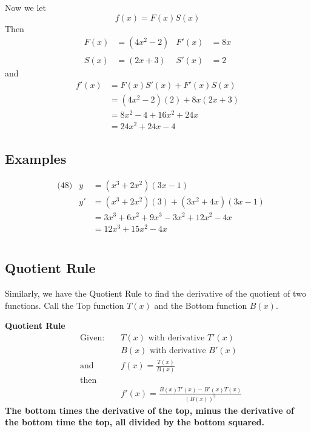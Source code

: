 \documentclass[14pt]{extarticle}
\begin{document}
Now we let
$$f(x) = F(x)S(x)$$
Then
\begin{align*}
	F(x) &= (4x^2 -2) & F'(x)&=8x \\\\
	S(x) &= (2x+3) & S'(x)&= 2
\end{align*}
and
\begin{align*}
	f'(x) &= F(x)S'(x) + F'(x)S(x) \\
	&= (4x^2 -2)(2) + 8x(2x+3) \\
	&= 8x^2-4 + 16x^2 +24x \\
	&= 24x^2 + 24x-4
\end{align*}

\subsection*{Examples}
\begin{align*}
	&\text{(48)} &y &= (x^3 + 2x^2)(3x-1) \\
	&			&y' &= (x^3 + 2x^2)(3) + (3x^2 + 4x)(3x -1) \\
	&			&    &= 3x^3 +6x^2 +  9x^3 - 3x^2 + 12x^2 -4x\\
	&			&    &= 12x^3 + 15x^2 - 4x\\\\
\end{align*}


\subsection*{Quotient Rule}
Similarly, we have the Quotient Rule to find the derivative of the quotient of two functions. Call the Top function $T(x)$ and the Bottom function $B(x)$.

\begin{tcolorbox}[enhanced jigsaw,colback=bg,boxrule=0pt,arc=0pt]
	\textbf{Quotient Rule}
	\begin{align*}
		&\text{Given: } & &T(x) \text{ with derivative } T'(x) \\
		& & &B(x) \text{ with derivative } B'(x) \\
		&\text{and } & &f(x) = \frac{T(x)}{B(x)} \\
		&\text{then }\\
		& & &f'(x) = \frac{B(x)T'(x) - B'(x)T(x)}{(B(x))^2}
	\end{align*}
	\textbf{The bottom times the derivative of the top, minus the derivative of the bottom time the top, all divided by the bottom squared.}
\end{tcolorbox}
\end{document}

